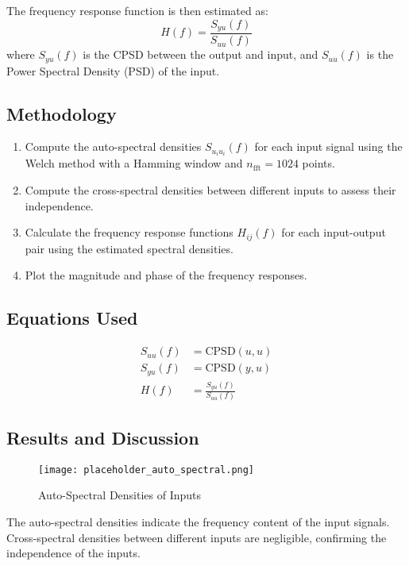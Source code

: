 \documentclass[12pt]{article}
\begin{document}
The frequency response function is then estimated as:
\begin{equation}
    H(f) = \frac{S_{yu}(f)}{S_{uu}(f)}
\end{equation}
where $S_{yu}(f)$ is the CPSD between the output and input, and $S_{uu}(f)$ is the Power Spectral Density (PSD) of the input.

\subsection{Methodology}
\begin{enumerate}
    \item Compute the auto-spectral densities $S_{u_iu_i}(f)$ for each input signal using the Welch method with a Hamming window and $n_{\text{fft}} = 1024$ points.
    \item Compute the cross-spectral densities between different inputs to assess their independence.
    \item Calculate the frequency response functions $H_{ij}(f)$ for each input-output pair using the estimated spectral densities.
    \item Plot the magnitude and phase of the frequency responses.
\end{enumerate}

\subsection{Equations Used}
\begin{align}
    S_{uu}(f) &= \text{CPSD}(u, u) \\
    S_{yu}(f) &= \text{CPSD}(y, u) \\
    H(f) &= \frac{S_{yu}(f)}{S_{uu}(f)}
\end{align}

\subsection{Results and Discussion}
\begin{figure}[H]
    \centering
    \texttt{[image: placeholder\_auto\_spectral.png]}
    \caption{Auto-Spectral Densities of Inputs}
    \label{fig:auto_spectral}
\end{figure}

The auto-spectral densities indicate the frequency content of the input signals. Cross-spectral densities between different inputs are negligible, confirming the independence of the inputs.
\end{document}
